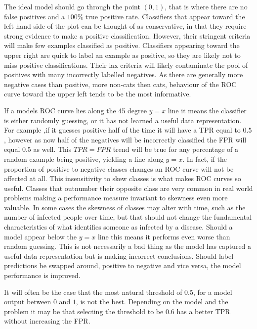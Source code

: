 The ideal model should go through the point $(0, 1)$, that is where there are no false positives and a $100\%$ true positive rate.
Classifiers that appear toward the left hand side of the plot can be thought of as conservative, in that they require strong evidence to make a positive classification.
However, their stringent criteria will make few examples classified as positive.
Classifiers appearing toward the upper right are quick to label an example as positive, so they are likely not to miss positive classifications.
Their lax criteria will likely contaminate the pool of positives with many incorrectly labelled negatives.
As there are generally more negative cases than positive, more non-cats then cats, behaviour of the ROC curve toward the upper left tends to be the most informative.

If a models ROC curve lies along the 45 degree $y = x$ line it means the classifier is either randomly guessing, or it has not learned a useful data representation.
For example ,if it guesses positive half of the time it will have a TPR equal to $0.5$, however as now half of the negatives will be incorrectly classified the FPR will equal $0.5$ as well.
This $TPR = FPR$ trend will be true for any percentage of a random example being positive, yielding a line along $y = x$.
In fact, if the proportion of positive to negative classes changes an ROC curve will not be affected at all.
This insensitivity to skew classes is what makes ROC curves so useful.
Classes that outnumber their opposite class are very common in real world problems making a performance measure invariant to skewness even more valuable.
In some cases the skewness of classes may alter with time, such as the number of infected people over time, but that should not change the fundamental characteristics of what identifies someone as infected by a disease.
Should a model appear below the $y = x$ line this means it performs even worse than random guessing.
This is not necessarily a bad thing as the model has captured a useful data representation but is making incorrect conclusions.
Should label predictions be swapped around, positive to negative and vice versa, the model performance is improved.

It will often be the case that the most natural threshold of $0.5$, for a model output between $0$ and $1$, is not the best.
Depending on the model and the problem it may be that selecting the threshold to be $0.6$ has a better TPR without increasing the FPR.

